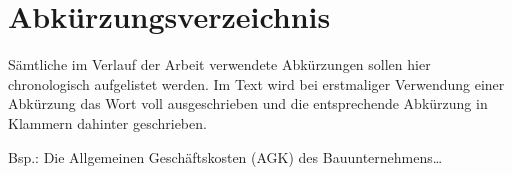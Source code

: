 
\chapter*{Abkürzungsverzeichnis}
\label{sec:Abkürzungsverzeichnis}







Sämtliche im Verlauf der Arbeit verwendete Abkürzungen sollen hier chronologisch aufgelistet werden.
Im Text wird bei erstmaliger Verwendung einer Abkürzung das Wort voll ausgeschrieben und die entsprechende Abkürzung in Klammern dahinter geschrieben.

Bsp.: Die Allgemeinen Geschäftskosten (AGK) des Bauunternehmens…



